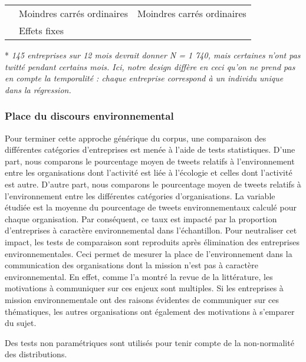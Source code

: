 \begin{table}
\begin{tabularx}{\linewidth}{|>{\bfseries}p{3cm}|X|X|}
            \multirow{2}{=}{Type de régression	}
                &Moindres carrés ordinaires & Moindres carrés ordinaires\\
                &Effets fixes&\\ \hline

            \end{tabularx}
            \footnotesize
                * \textit{145 entreprises sur 12 mois devrait donner N = 1 740, mais certaines n'ont pas twitté pendant certains mois. Ici, notre design diffère en ceci qu'on ne prend pas en compte la temporalité : chaque entreprise correspond à un individu unique dans la régression. }
        \end{table}

    \subsubsection{Place du discours environnemental}
    \label{twitter:placediscours}
        Pour terminer cette approche générique du corpus, une comparaison des différentes catégories d'entreprises est menée à l'aide de tests statistiques. D'une part, nous comparons le pourcentage moyen de tweets relatifs à l'environnement entre les organisations dont l'activité est liée à l'écologie et celles dont l'activité est autre. D'autre part, nous comparons le pourcentage moyen de tweets relatifs à l'environnement entre les différentes catégories d'organisations. La variable étudiée est la moyenne du pourcentage de tweets environnementaux calculé pour chaque organisation. Par conséquent, ce taux est impacté par la proportion d'entreprises à caractère environnemental dans l'échantillon. Pour neutraliser cet impact, les tests de comparaison sont reproduits après élimination des entreprises environnementales. Ceci permet de mesurer la place de l'environnement dans la communication des organisations dont la mission n'est pas à caractère environnemental. En effet, comme l'a montré la revue de la littérature, les motivations à communiquer sur ces enjeux sont multiples. Si les entreprises à mission environnementale ont des raisons évidentes de communiquer sur ces thématiques, les autres organisations ont également des motivations à s'emparer du sujet.

        Des tests non paramétriques sont utilisés pour tenir compte de la non-normalité des distributions.

